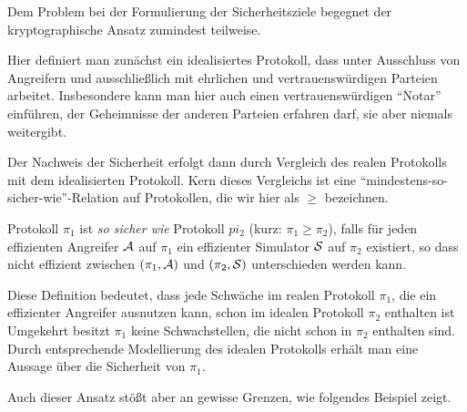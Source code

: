 Dem Problem bei der Formulierung der Sicherheitsziele begegnet der kryptographische Ansatz zumindest teilweise.

Hier definiert man zunächst ein idealisiertes Protokoll, dass unter Ausschluss von Angreifern und ausschließlich mit ehrlichen und vertrauenswürdigen Parteien arbeitet.
Insbesondere kann man hier auch einen vertrauenswürdigen "`Notar"' einführen, der Geheimnisse der anderen Parteien erfahren darf, sie aber niemals weitergibt.

Der Nachweis der Sicherheit erfolgt dann durch Vergleich des realen Protokolls mit dem idealisierten Protokoll. Kern dieses Vergleichs ist eine "`mindestens-so-sicher-wie"'-Relation auf Protokollen, die wir hier als $\geq$ bezeichnen.\\

\begin{definition}
    Protokoll $\pi_1$ ist \emph{so sicher wie} Protokoll $pi_2$ (kurz: $\pi_1 \geq \pi_2$), falls
    für jeden effizienten Angreifer $\mathcal{A}$ auf $\pi_1$
    ein effizienter Simulator $\mathcal{S}$ auf $\pi_2$ existiert, so dass
    nicht effizient zwischen $(\pi_1,\mathcal{A})$ und $(\pi_2,\mathcal{S})$
    unterschieden werden kann.
\end{definition}

Diese Definition bedeutet, dass jede Schwäche im realen Protokoll $\pi_1$, die ein effizienter Angreifer ausnutzen kann, schon im idealen Protokoll $\pi_2$ enthalten ist
Umgekehrt besitzt $\pi_1$ keine Schwachstellen, die nicht schon in $\pi_2$ enthalten sind.
Durch entsprechende Modellierung des idealen Protokolls erhält man eine Aussage über die Sicherheit von $\pi_1$.

Auch dieser Ansatz stößt aber an gewisse Grenzen, wie folgendes Beispiel zeigt.\\


